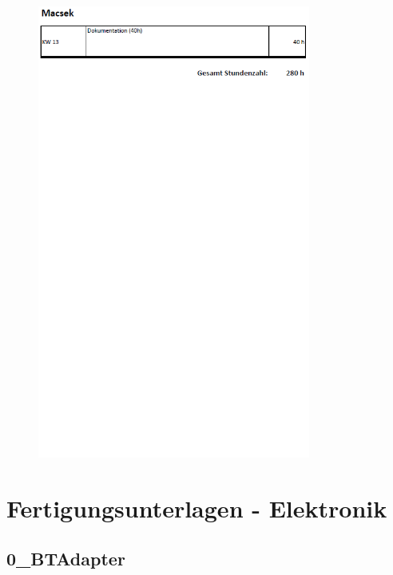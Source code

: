 \begin{figure} [H]
	\centering
	\includegraphics[width=0.8\textwidth]{form/ArbeitsnachweisMacsek3von3.png}
\end{figure}





\newpage
\section{Fertigungsunterlagen - Elektronik}\label{sec:8.10}
\subsection{0\_BTAdapter}
